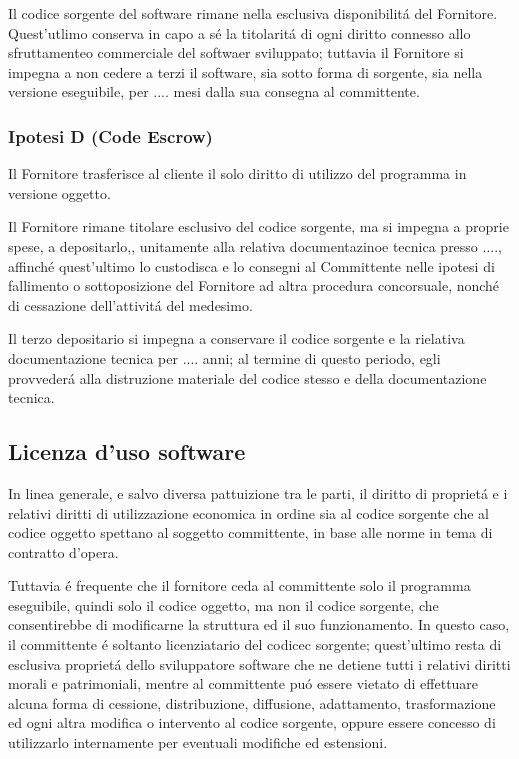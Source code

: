 \documentclass{article}
\begin{document}
Il codice sorgente del software rimane nella esclusiva disponibilit\'a del Fornitore. Quest'utlimo conserva in capo a s\'e la titolarit\'a di ogni diritto connesso allo sfruttamenteo commerciale del softwaer sviluppato; tuttavia il Fornitore si impegna a non cedere a terzi il software, sia sotto forma di sorgente, sia nella versione eseguibile, per .... mesi dalla sua consegna al committente.

\subsubsection{Ipotesi D (Code Escrow)}
Il Fornitore trasferisce al cliente il solo diritto di utilizzo del programma in versione oggetto. 

Il Fornitore rimane titolare esclusivo del codice sorgente, ma si impegna a proprie spese, a depositarlo,, unitamente alla relativa documentazinoe tecnica presso ...., affinch\'e quest'ultimo lo custodisca e lo consegni al Committente nelle ipotesi di fallimento o sottoposizione del Fornitore ad altra procedura concorsuale, nonch\'e di cessazione dell'attivit\'a del medesimo. 

Il terzo depositario si impegna a conservare il codice sorgente e la rielativa documentazione tecnica per .... anni; al termine di questo periodo, egli provveder\'a alla distruzione materiale del codice stesso e della documentazione tecnica.

\subsection{Licenza d'uso software}
In linea generale, e salvo diversa pattuizione tra le parti, il diritto di propriet\'a e i relativi diritti di utilizzazione economica in ordine sia al codice sorgente che al codice oggetto spettano al soggetto committente, in base alle norme in tema di contratto d'opera.

Tuttavia \'e frequente che il fornitore ceda al committente solo il programma eseguibile, quindi solo il codice oggetto, ma non il codice sorgente, che consentirebbe di modificarne la struttura ed il suo funzionamento. In questo caso, il committente \'e soltanto licenziatario del codicec sorgente; quest'ultimo resta di esclusiva propriet\'a dello sviluppatore  software che ne detiene tutti i relativi diritti morali e patrimoniali, mentre al committente pu\'o essere vietato di effettuare alcuna forma di cessione, distribuzione, diffusione, adattamento, trasformazione ed ogni altra modifica o intervento al codice sorgente, oppure essere concesso di utilizzarlo internamente per eventuali modifiche ed estensioni. 
\end{document}
